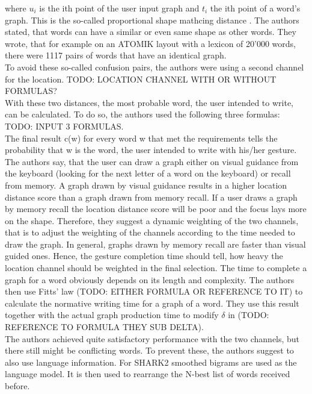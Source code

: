 where $u_i$ is the ith point of the user input graph and $t_i$ the ith point of a word's graph. This is the so-called proportional shape mathcing distance \cite{Kristensson2004SHARK2AL}. The authors stated, that words can have a similar or even same shape as other words. They wrote, that for example on an ATOMIK layout with a lexicon of 20'000 words, there were 1117 pairs of words that have an identical graph.\\
To avoid these so-called confusion pairs, the authors were using a second channel for the location. TODO: LOCATION CHANNEL WITH OR WITHOUT FORMULAS?\\

With these two distances, the most probable word, the user intended to write, can be calculated. To do so, the authors used the following three formulas: TODO: INPUT 3 FORMULAS.\\

The final result c(w) for every word w that met the requirements tells the probability that w is the word, the user intended to write with his/her gesture.\\
The authors say, that the user can draw a graph either on visual guidance from the keyboard (looking for the next letter of a word on the keyboard) or recall from memory. A graph drawn by visual guidance results in a higher location distance score than a graph drawn from memory recall. If a user draws a graph by memory recall the location distance score will be poor and the focus lays more on the shape. Therefore, they suggest a dynamic weighting of the two channels, that is to adjust the weighting of the channels according to the time needed to draw the graph. In general, graphs drawn by memory recall are faster than visual guided ones. Hence, the gesture completion time should tell, how heavy the location channel should be weighted in the final selection. The time to complete a graph for a word obviously depends on its length and complexity. The authors then use Fitts' law (TODO: EITHER FORMULA OR REFERENCE TO IT) to calculate the normative writing time for a graph of a word. They use this result together with the actual graph production time to modify $\delta$ in (TODO: REFERENCE TO FORMULA THEY SUB DELTA).\\
The authors achieved quite satisfactory performance with the two channels, but there still might be conflicting words. To prevent these, the authors suggest to also use language information. For SHARK2 smoothed bigrams are used as the language model. It is then used to rearrange the N-best list of words received before.